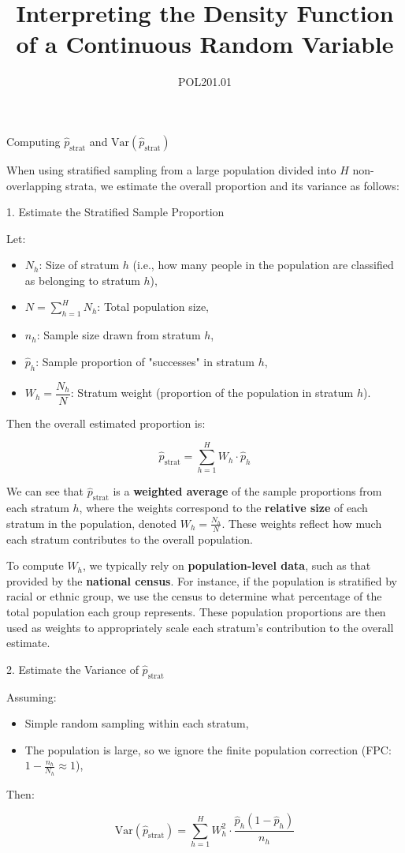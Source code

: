 \documentclass[12pt]{article}
\title{Interpreting the Density Function of a Continuous Random Variable}
\author{POL201.01}
\date{}
\begin{document}
Computing \( \hat{p}_{\text{strat}} \) and \( \text{Var}(\hat{p}_{\text{strat}}) \)

When using stratified sampling from a large population divided into \( H \) non-overlapping strata, we estimate the overall proportion and its variance as follows:


1. Estimate the Stratified Sample Proportion

Let:
\begin{itemize}
    \item  \( N_h \): Size of stratum \( h \) (i.e., how many people in the population are classified as belonging to stratum $h$),
    \item  \( N = \sum_{h=1}^H N_h \): Total population size,
    \item  \( n_h \): Sample size drawn from stratum \( h \),
    \item \( \hat{p}_h \): Sample proportion of "successes" in stratum \( h \),
    \item \( W_h = \dfrac{N_h}{N} \): Stratum weight (proportion of the population in stratum \( h \)).
\end{itemize}

Then the overall estimated proportion is:

\[
\hat{p}_{\text{strat}} = \sum_{h=1}^{H} W_h \cdot \hat{p}_h
\]

We can see that \( \hat{p}_{\text{strat}} \) is a \textbf{weighted average} of the sample proportions from each stratum \( h \), where the weights correspond to the \textbf{relative size} of each stratum in the population, denoted \( W_h = \frac{N_h}{N} \). These weights reflect how much each stratum contributes to the overall population. 

To compute \( W_h \), we typically rely on \textbf{population-level data}, such as that provided by the \textbf{national census}. For instance, if the population is stratified by racial or ethnic group, we use the census to determine what percentage of the total population each group represents. These population proportions are then used as weights to appropriately scale each stratum’s contribution to the overall estimate.


2. Estimate the Variance of \( \hat{p}_{\text{strat}} \)

Assuming:
\begin{itemize}
    \item Simple random sampling within each stratum,
    \item The population is large, so we ignore the finite population correction (FPC: \( 1 - \frac{n_h}{N_h} \approx 1 \)),
\end{itemize}

Then:

\[
\text{Var}(\hat{p}_{\text{strat}}) = \sum_{h=1}^{H} W_h^2 \cdot \frac{\hat{p}_h (1 - \hat{p}_h)}{n_h}
\]
\end{document}
